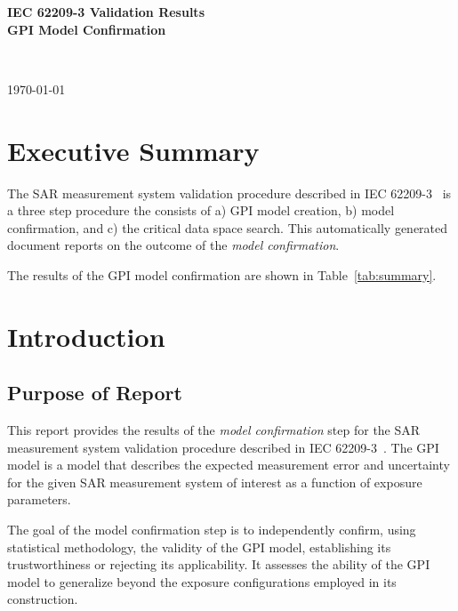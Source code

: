 \documentclass{article}
\begin{document}
\flushright
\begin{Large}
\textbf{IEC 62209-3 Validation Results} \\
\vspace{3pt}
\textbf{GPI Model Confirmation}
\end{Large} \\
\begin{small}
\today \\ \currenttime
\end{small}
\flushleft

\section{Executive Summary}\label{sec:exec_summary}
The SAR measurement system validation procedure described in IEC 62209-3~\cite{standard} is a three step procedure the consists of a) GPI model creation, b) model confirmation, and c) the critical data space search. This automatically generated document reports on the outcome of the \textit{model confirmation}.



The results of the GPI model confirmation are shown in Table~\ref{tab:summary}.





\section{Introduction}\label{sec:start}

\subsection{Purpose of Report}\label{sec:intro}

This report provides the results of the \textit{model confirmation} step for the SAR measurement system validation procedure described in IEC 62209-3~\cite{standard}. The GPI model is a model that describes the expected measurement error and uncertainty for the given SAR measurement system of interest as a function of exposure parameters.

The goal of the model confirmation step is to independently confirm, using statistical methodology, the validity of the GPI model, establishing its trustworthiness or rejecting its applicability. It assesses the ability of the GPI model to generalize beyond the exposure configurations employed in its construction.
\end{document}
